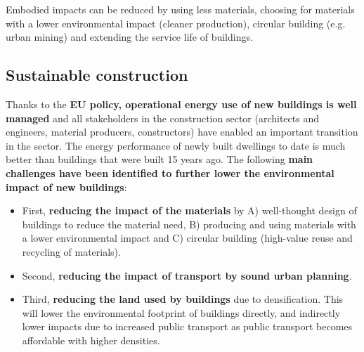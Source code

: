\documentclass[../summary.tex]{subfiles}
\begin{document}
	Embodied impacts can be reduced by using less materials, choosing for materials with a lower environmental impact (cleaner production),
	circular building (e.g. urban mining) and extending the service life of buildings.
	\newpage
	\subsection{Sustainable construction}
	
	Thanks to the \textbf{EU policy, operational energy use of new buildings is well managed} and all stakeholders in the construction sector (architects and engineers, material producers, constructors) have enabled an important transition in the sector. The energy performance of newly built dwellings to date is much better than buildings that were built 15 years ago. The following \textbf{main challenges have been identified to further lower the environmental impact of new buildings}:
	\begin{itemize}
	\item First, \textbf{reducing the impact of the materials} by A) well-thought design of buildings to reduce the material need, B) producing and using materials with a lower environmental impact and C) circular building (high-value reuse and recycling of materials).
	\item Second, \textbf{reducing the impact of transport by sound urban planning}.
	\item Third, \textbf{reducing the land used by buildings} due to densification. This will lower the environmental footprint of buildings directly, and indirectly lower impacts due to increased public transport as public transport becomes affordable with higher densities.
	\end{itemize}
	
\end{document}
